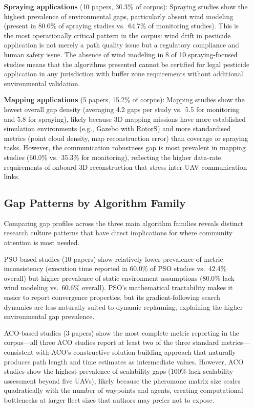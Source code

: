 \documentclass[review,3p,times]{elsarticle}
\begin{document}
\textbf{Spraying applications} (10 papers, 30.3\% of corpus): Spraying studies show the highest prevalence of environmental gaps, particularly absent wind modeling (present in 80.0\% of spraying studies vs.\ 64.7\% of monitoring studies). This is the most operationally critical pattern in the corpus: wind drift in pesticide application is not merely a path quality issue but a regulatory compliance and human safety issue. The absence of wind modeling in 8 of 10 spraying-focused studies means that the algorithms presented cannot be certified for legal pesticide application in any jurisdiction with buffer zone requirements without additional environmental validation.

\textbf{Mapping applications} (5 papers, 15.2\% of corpus): Mapping studies show the lowest overall gap density (averaging 4.2 gaps per study vs.\ 5.5 for monitoring and 5.8 for spraying), likely because 3D mapping missions have more established simulation environments (e.g., Gazebo with RotorS) and more standardised metrics (point cloud density, map reconstruction error) than coverage or spraying tasks. However, the communication robustness gap is most prevalent in mapping studies (60.0\% vs.\ 35.3\% for monitoring), reflecting the higher data-rate requirements of onboard 3D reconstruction that stress inter-UAV communication links.

\subsection{Gap Patterns by Algorithm Family}

Comparing gap profiles across the three main algorithm families reveals distinct research culture patterns that have direct implications for where community attention is most needed.

PSO-based studies (10 papers) show relatively lower prevalence of metric inconsistency (execution time reported in 60.0\% of PSO studies vs.\ 42.4\% overall) but higher prevalence of static environment assumptions (80.0\% lack wind modeling vs.\ 60.6\% overall). PSO's mathematical tractability makes it easier to report convergence properties, but its gradient-following search dynamics are less naturally suited to dynamic replanning, explaining the higher environmental gap prevalence.

ACO-based studies (3 papers) show the most complete metric reporting in the corpus---all three ACO studies report at least two of the three standard metrics---consistent with ACO's constructive solution-building approach that naturally produces path length and time estimates as intermediate values. However, ACO studies show the highest prevalence of scalability gaps (100\% lack scalability assessment beyond five UAVs), likely because the pheromone matrix size scales quadratically with the number of waypoints and agents, creating computational bottlenecks at larger fleet sizes that authors may prefer not to expose.
\end{document}
